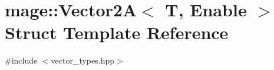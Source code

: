 \hypertarget{structmage_1_1_vector2_a}{}\section{mage\+:\+:Vector2A$<$ T, Enable $>$ Struct Template Reference}
\label{structmage_1_1_vector2_a}


{\ttfamily \#include $<$vector\+\_\+types.\+hpp$>$}

